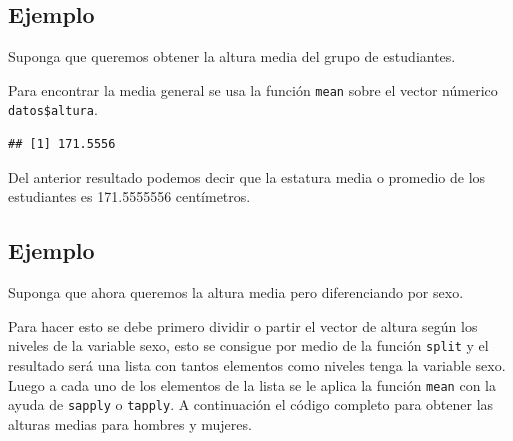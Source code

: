 \documentclass[
]{book}
\makeatletter
\newenvironment{Shaded}{\begin{snugshade}}{\end{snugshade}}
\newcommand{\AttributeTok}[1]{\textcolor[rgb]{0.77,0.63,0.00}{#1}}
\newcommand{\FunctionTok}[1]{\textcolor[rgb]{0.00,0.00,0.00}{#1}}
\newcommand{\NormalTok}[1]{#1}
\newcommand{\SpecialCharTok}[1]{\textcolor[rgb]{0.00,0.00,0.00}{#1}}
\newenvironment{kframe}{%
\medskip{}
\setlength{\fboxsep}{.8em}
 \def\at@end@of@kframe{}%
 \ifinner\ifhmode%
  \def\at@end@of@kframe{\end{minipage}}%
  \begin{minipage}{\columnwidth}%
 \fi\fi%
 \def\FrameCommand##1{\hskip\@totalleftmargin \hskip-\fboxsep
 \colorbox{shadecolor}{##1}\hskip-\fboxsep
     \hskip-\linewidth \hskip-\@totalleftmargin \hskip\columnwidth}%
 \MakeFramed {\advance\hsize-\width
   \@totalleftmargin\z@ \linewidth\hsize
   \@setminipage}}%
 {\par\unskip\endMakeFramed%
 \at@end@of@kframe}
\renewenvironment{Shaded}{\begin{kframe}}{\end{kframe}}
\makeatother
\begin{document}
\hypertarget{ejemplo-30}{%
\subsection*{Ejemplo}\label{ejemplo-30}}

Suponga que queremos obtener la altura media del grupo de estudiantes.

Para encontrar la media general se usa la función \texttt{mean} sobre el vector númerico \texttt{datos\$altura}.

\begin{Shaded}
\end{Shaded}

\begin{verbatim}
## [1] 171.5556
\end{verbatim}

Del anterior resultado podemos decir que la estatura media o promedio de los estudiantes es 171.5555556 centímetros.

\hypertarget{ejemplo-31}{%
\subsection*{Ejemplo}\label{ejemplo-31}}

Suponga que ahora queremos la altura media pero diferenciando por sexo.

Para hacer esto se debe primero dividir o partir el vector de altura según los niveles de la variable sexo, esto se consigue por medio de la función \texttt{split} y el resultado será una lista con tantos elementos como niveles tenga la variable sexo. Luego a cada uno de los elementos de la lista se le aplica la función \texttt{mean} con la ayuda de \texttt{sapply} o \texttt{tapply}. A continuación el código completo para obtener las alturas medias para hombres y mujeres.

\begin{Shaded}
\end{Shaded}
\end{document}
